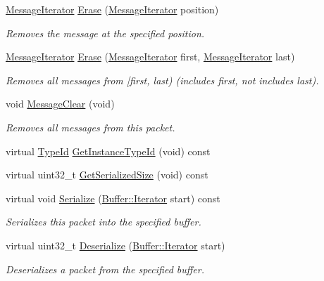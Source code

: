 \begin{DoxyCompactItemize}
\hyperlink{classns3_1_1PbbPacket_a5fed659b1aebf8573c8f3aebe41e6013}{Message\+Iterator} \hyperlink{classns3_1_1PbbPacket_a0ff4e5a1a7b2d2f6cedbb3cd05334a07}{Erase} (\hyperlink{classns3_1_1PbbPacket_a5fed659b1aebf8573c8f3aebe41e6013}{Message\+Iterator} position)
\begin{DoxyCompactList}\small\item\em Removes the message at the specified position. \end{DoxyCompactList}\item 
\hyperlink{classns3_1_1PbbPacket_a5fed659b1aebf8573c8f3aebe41e6013}{Message\+Iterator} \hyperlink{classns3_1_1PbbPacket_abf2c0a98b46259dfbb24febf24af7a36}{Erase} (\hyperlink{classns3_1_1PbbPacket_a5fed659b1aebf8573c8f3aebe41e6013}{Message\+Iterator} first, \hyperlink{classns3_1_1PbbPacket_a5fed659b1aebf8573c8f3aebe41e6013}{Message\+Iterator} last)
\begin{DoxyCompactList}\small\item\em Removes all messages from \mbox{[}first, last) (includes first, not includes last). \end{DoxyCompactList}\item 
void \hyperlink{classns3_1_1PbbPacket_a0c357536a3169ffab04041772f0f2a57}{Message\+Clear} (void)
\begin{DoxyCompactList}\small\item\em Removes all messages from this packet. \end{DoxyCompactList}\item 
virtual \hyperlink{classns3_1_1TypeId}{Type\+Id} \hyperlink{classns3_1_1PbbPacket_abcf5ddb0cccf9e1582d124a93926af9d}{Get\+Instance\+Type\+Id} (void) const 
\item 
virtual uint32\+\_\+t \hyperlink{classns3_1_1PbbPacket_ab9bd58d63f614db5e989df49ef192593}{Get\+Serialized\+Size} (void) const 
\item 
virtual void \hyperlink{classns3_1_1PbbPacket_acf27d0bf18096412f390651995e9a362}{Serialize} (\hyperlink{classns3_1_1Buffer_1_1Iterator}{Buffer\+::\+Iterator} start) const 
\begin{DoxyCompactList}\small\item\em Serializes this packet into the specified buffer. \end{DoxyCompactList}\item 
virtual uint32\+\_\+t \hyperlink{classns3_1_1PbbPacket_a6bb42350cf2613e48d9c7c50a0c71f93}{Deserialize} (\hyperlink{classns3_1_1Buffer_1_1Iterator}{Buffer\+::\+Iterator} start)
\begin{DoxyCompactList}\small\item\em Deserializes a packet from the specified buffer. \end{DoxyCompactList}\item 

\end{DoxyCompactItemize}
